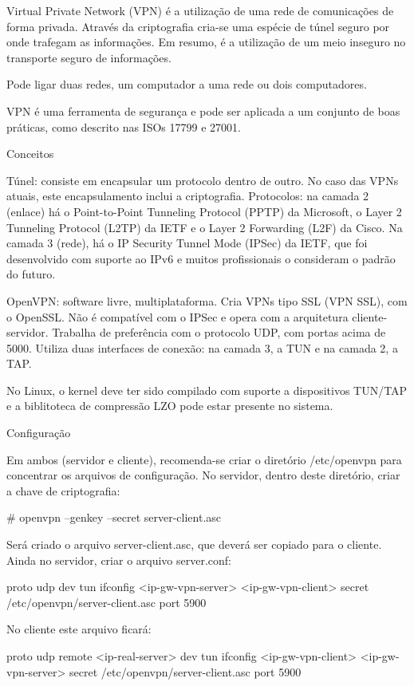 Virtual Private Network (VPN) é a utilização de uma rede de comunicações de forma privada. Através da criptografia cria-se uma espécie de túnel seguro por onde trafegam as informações. Em resumo, é a utilização de um meio inseguro no transporte seguro de informações.

Pode ligar duas redes, um computador a uma rede ou dois computadores.

VPN é uma ferramenta de segurança e pode ser aplicada a um conjunto de boas práticas, como descrito nas ISOs 17799 e 27001.

Conceitos

Túnel: consiste em encapsular um protocolo dentro de outro. No caso das VPNs atuais, este encapsulamento inclui a criptografia.
Protocolos: na camada 2 (enlace) há o Point-to-Point Tunneling Protocol (PPTP) da Microsoft, o Layer 2 Tunneling Protocol (L2TP) da IETF e o Layer 2 Forwarding (L2F) da Cisco. Na camada 3 (rede), há o IP Security Tunnel Mode (IPSec) da IETF, que foi desenvolvido com suporte ao IPv6 e muitos profissionais o consideram o padrão do futuro.

OpenVPN: software livre, multiplataforma. Cria VPNs tipo SSL (VPN SSL), com o OpenSSL. Não é compatível com o IPSec e opera com a arquitetura cliente-servidor. Trabalha de preferência com o protocolo UDP, com portas acima de 5000. Utiliza duas interfaces de conexão: na camada 3, a TUN e na camada 2, a TAP.

No Linux, o kernel deve ter sido compilado com suporte a dispositivos TUN/TAP e a biblitoteca de compressão LZO pode estar presente no sistema.

Configuração

Em ambos (servidor e cliente), recomenda-se criar o diretório /etc/openvpn para concentrar os arquivos de configuração. No servidor, dentro deste diretório, criar a chave de criptografia:

# openvpn --genkey --secret server-client.asc

Será criado o arquivo server-client.asc, que deverá ser copiado para o cliente. Ainda no servidor, criar o arquivo server.conf:

proto udp
dev tun
ifconfig <ip-gw-vpn-server> <ip-gw-vpn-client>
secret /etc/openvpn/server-client.asc
port 5900

No cliente este arquivo ficará:

proto udp
remote <ip-real-server>
dev tun
ifconfig <ip-gw-vpn-client> <ip-gw-vpn-server>
secret /etc/openvpn/server-client.asc
port 5900

